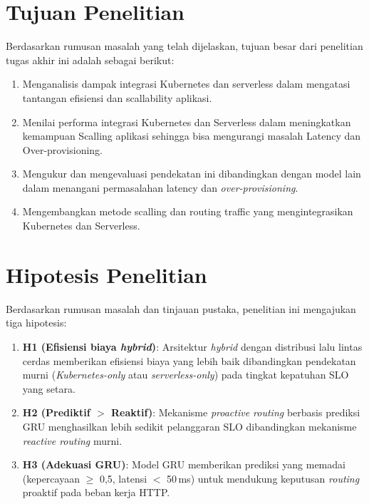 \section{Tujuan Penelitian}
\label{sec:tujuan-penelitian}

Berdasarkan rumusan masalah yang telah dijelaskan, tujuan besar dari penelitian tugas akhir ini adalah sebagai berikut:

\begin{enumerate}
    \item Menganalisis dampak integrasi Kubernetes dan serverless dalam mengatasi tantangan efisiensi dan scallability aplikasi.
    \item Menilai performa integrasi Kubernetes dan Serverless dalam meningkatkan kemampuan Scalling aplikasi sehingga bisa mengurangi masalah Latency dan Over-provisioning.
    \item Mengukur dan mengevaluasi pendekatan ini dibandingkan dengan model lain dalam menangani permasalahan latency dan \emph{over-provisioning}.
    \item Mengembangkan metode scalling dan routing traffic yang mengintegrasikan Kubernetes dan Serverless.
\end{enumerate}


\section{Hipotesis Penelitian}
\label{sec:hipotesis}

Berdasarkan rumusan masalah dan tinjauan pustaka, penelitian ini mengajukan tiga hipotesis:

\begin{enumerate}
    \item \textbf{H1 (Efisiensi biaya \emph{hybrid})}: Arsitektur \emph{hybrid} dengan distribusi lalu lintas cerdas memberikan efisiensi biaya yang lebih baik dibandingkan pendekatan murni (\emph{Kubernetes-only} atau \emph{serverless-only}) pada tingkat kepatuhan SLO yang setara.
    \item \textbf{H2 (Prediktif $>$ Reaktif)}: Mekanisme \emph{proactive routing} berbasis prediksi GRU menghasilkan lebih sedikit pelanggaran SLO dibandingkan mekanisme \emph{reactive routing} murni.
    \item \textbf{H3 (Adekuasi GRU)}: Model GRU memberikan prediksi yang memadai (kepercayaan $\geq$ 0,5, latensi $<$ 50\,ms) untuk mendukung keputusan \emph{routing} proaktif pada beban kerja HTTP.
\end{enumerate}

